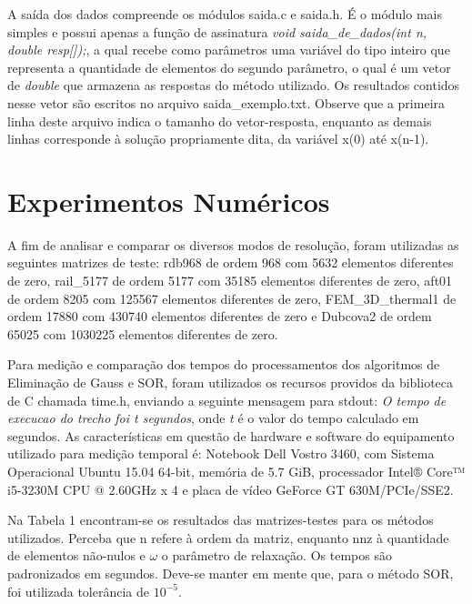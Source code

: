 \documentclass[
	article,			%
	11pt,				%
	oneside,			%
	a4paper,			%
	english,			%
	brazil,				%
	sumario=tradicional
	]{abntex2}
\begin{document}
A saída dos dados compreende os módulos saida.c e saida.h. É o módulo mais simples e possui apenas a função de assinatura \emph{void saida\_de\_dados(int n, double resp[]);}, a qual recebe como parâmetros uma variável do tipo inteiro que representa a quantidade de elementos do segundo parâmetro, o qual é um vetor de \emph{double} que armazena as respostas do método utilizado. Os resultados contidos nesse vetor são escritos no arquivo saida\_exemplo.txt. Observe que a primeira linha deste arquivo indica o tamanho do vetor-resposta, enquanto as demais linhas corresponde à solução propriamente dita, da variável x(0) até x(n-1).

\section{Experimentos Numéricos}

A fim de analisar e comparar os diversos modos de resolução, foram utilizadas as seguintes matrizes de teste: rdb968 de ordem 968 com 5632 elementos diferentes de zero, rail\_5177 de ordem 5177 com 35185 elementos diferentes de zero, aft01 de ordem 8205 com 125567 elementos diferentes de zero, FEM\_3D\_thermal1 de ordem 17880 com 430740 elementos diferentes de zero e Dubcova2 de ordem 65025 com 1030225 elementos diferentes de zero.

Para medição e comparação dos tempos do processamentos dos algoritmos de Eliminação de Gauss e SOR, foram utilizados os recursos providos da biblioteca de C chamada time.h, enviando a seguinte mensagem para stdout: \emph{O tempo de execucao do trecho foi t segundos}, onde \emph{t} é o valor do tempo calculado em segundos. As características em questão de hardware e software do equipamento utilizado para medição temporal é: Notebook Dell Vostro 3460, com Sistema Operacional Ubuntu 15.04 64-bit, memória de 5.7 GiB, processador Intel® Core™ i5-3230M CPU @ 2.60GHz x 4 e placa de vídeo GeForce GT 630M/PCIe/SSE2.

Na Tabela 1 encontram-se os resultados das matrizes-testes para os métodos utilizados. Perceba que n refere à ordem da matriz, enquanto nnz à quantidade de elementos não-nulos e $\omega$ o parâmetro de relaxação. Os tempos são padronizados em segundos. Deve-se manter em mente que, para o método SOR, foi utilizada tolerância de $10^{-5}$.
\end{document}
